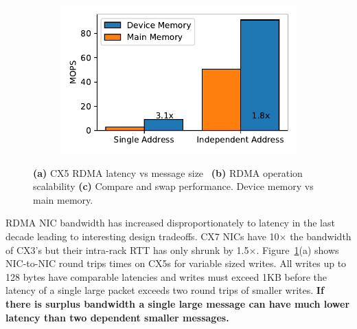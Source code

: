 \begin{figure}[t]
    \begin{subfigure}{0.3\linewidth}
        \includegraphics[width=0.99\linewidth]{fig/rdma_cas_throughput.pdf}
    \end{subfigure}
    \vspace{-1em}
    \caption{
    \textbf{(a)} CX5 RDMA latency vs message size~\cite{rdma-latency}
    \textbf{(b)} RDMA operation scalability
    \textbf{(c)} Compare and swap performance. Device memory vs main memory.
    }
    \label{fig:rdma-benchmarks}
\end{figure}


RDMA NIC bandwidth has increased disproportionately to
latency in the last decade leading to interesting design
tradeoffs. CX7 NICs have 10$\times$ the bandwidth of CX3's
but their intra-rack RTT has only shrunk by 1.5$\times$.
Figure~\ref{fig:rdma-benchmarks}(a) shows NIC-to-NIC round
trips times on CX5s for variable sized writes. All writes up
to 128 bytes have comparable latencies and writes must
exceed 1KB before the latency of a single large packet
exceeds two round trips of smaller writes. \textbf{If there
is surplus bandwidth a single large message can have much
lower latency than two dependent smaller messages.}

